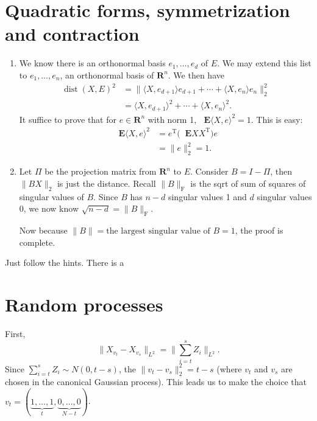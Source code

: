 \documentclass[11pt]{article}
\newcommand{\R}{\mathbf{R}}
\newcommand{\inp}[2]{\langle #1, #2 \rangle}
\newcommand{\nm}[1]{\lVert #1 \rVert}
\newcommand{\trp}{\mathrm T}
\newcommand{\E}{\mathop{}\!\mathbf{E}}
\theoremstyle{plain}
\theoremstyle{definition}
\theoremstyle{remark}
\theoremstyle{definition}
\newenvironment{mansol}[1]{%
  \renewcommand\themansolinner{#1}%
  \mansolinner
}{\endmansolinner}
\begin{document}
\newpage
\section{Quadratic forms, symmetrization and contraction}
\begin{mansol}{6.3.4}
    \begin{enumerate}[label=(\alph*)]
        \item We know there is an orthonormal basis $e_1,\ldots,e_d$ of $E$. We may extend this list to $e_1,\ldots,e_n$, an orthonormal basis of $\R^n$. We then have \begin{align*}
        \operatorname{dist}(X,E)^2 & = \nm{\inp{X}{e_{d+1}}e_{d+1} + \cdots + \inp{X}{e_n}e_n}_2^2 \\ & = \inp{X}{e_{d+1}}^2 + \cdots + \inp{X}{e_n}^2.
        \end{align*}
    It suffice to prove that for $e \in \R^n$ with norm 1, $\E \inp{X}{e}^2 = 1$. This is easy: 
    \begin{align*}
        \E \inp{X}{e}^2 & = e^\trp \bigl(\E X X^\trp\bigr) e \\ & = \nm{e}_2^2 = 1.
    \end{align*}
    \item Let $\Pi$ be the projection matrix from $\R^n$ to $E$. Consider $B = I - \Pi$, then $\nm{BX}_2$ is just the distance. Recall $\nm{B}_{\mathrm F}$ is the sqrt of sum of squares of singular values of $B$. Since $B$ has $n - d$ singular values 1 and $d$ singular values 0, we now know $\sqrt{n-d} = \nm{B}_{\mathrm F}$.

    Now because $\nm{B} = \text{the largest singular value of }B = 1$, the proof is complete.
    \end{enumerate}
\end{mansol}

\begin{mansol}{6.5.2}
    Just follow the hints. There is a 
\end{mansol}

\newpage
\section{Random processes}
\begin{mansol}{7.1.13}
    First, \[\nm{X_{v_t} - X_{v_s}}_{L^2} = \Big\lVert\sum_{i=t}^s Z_i\Big\rVert_{L^2}.\] Since $\sum_{i=t}^s Z_i \sim N(0,t-s)$, the $\nm{v_t-v_s}_2^2 = t-s$ (where $v_t$ and $v_s$ are chosen in the canonical Gaussian process). This leads us to make the choice that $v_t = (\underbrace{1,\ldots,1}_{t},\underbrace{0,\ldots,0}_{N-t})$.
\end{mansol}

\begin{mansol}{}
    
\end{mansol}

\begin{mansol}{}
    
\end{mansol}
\end{document}
